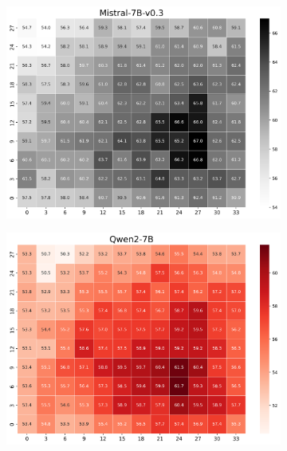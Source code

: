 \documentclass[11pt]{article}
\begin{document}
\begin{figure}[h]
    \begin{subfigure}[b]{0.3\linewidth}
        \centering
        \includegraphics[width=\linewidth]{picture/figure3_Mistral-7B-v0.3.png}
    \end{subfigure}
    \begin{subfigure}[b]{0.3\linewidth}
        \centering
        \includegraphics[width=\linewidth]{picture/figure3_Qwen2-7B.png}
    \end{subfigure}
    \begin{subfigure}[b]{0.3\linewidth}
        \centering

\end{subfigure}
\end{figure}
\end{document}
